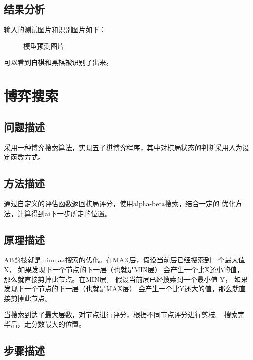 \documentclass[UTF8]{article}
\begin{document}
\subsection{结果分析}

输入的测试图片和识别图片如下：
 
    \begin{figure}[H]
            \centering
            \caption{模型预测图片}
            
    \end{figure}

可以看到白棋和黑棋被识别了出来。

\section{博弈搜索}
\subsection{问题描述}
采用一种博弈搜索算法，实现五子棋博弈程序，其中对棋局状态的判断采用人为设
定函数方式。
\subsection{方法描述}

通过自定义的评估函数返回棋局评分，使用alpha-beta搜索，结合一定的
优化方法，计算得到ai下一步所走的位置。

\subsection{原理描述}

AB剪枝就是minmax搜索的优化。在MAX层，假设当前层已经搜索到一个最大值 X， 
如果发现下一个节点的下一层（也就是MIN层）
会产生一个比X还小的值，那么就直接剪掉此节点。在MIN层，
假设当前层已经搜索到一个最小值 Y， 如果发现下一个节点的下一层（也就是MAX层）
会产生一个比Y还大的值，那么就直接剪掉此节点。

当搜索到达了最大层数，对节点进行评分，根据不同节点评分进行剪枝。
搜索完毕后，走分数最大的位置。

\subsection{步骤描述}
\end{document}
